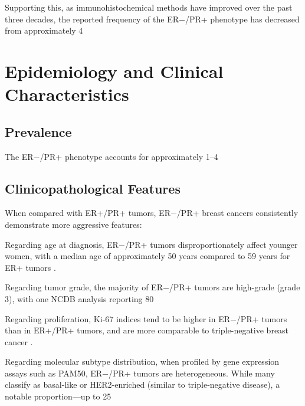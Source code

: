 \documentclass{article}
\begin{document}
Supporting this, as immunohistochemical methods have improved over the past three decades, the reported frequency of the ER−/PR+ phenotype has decreased from approximately 4%

\section{Epidemiology and Clinical Characteristics}

\subsection{Prevalence}

The ER−/PR+ phenotype accounts for approximately 1–4%

\subsection{Clinicopathological Features}

When compared with ER+/PR+ tumors, ER−/PR+ breast cancers consistently demonstrate more aggressive features:

Regarding age at diagnosis, ER−/PR+ tumors disproportionately affect younger women, with a median age of approximately 50 years compared to 59 years for ER+ tumors \citep{deyarmin2015}.

Regarding tumor grade, the majority of ER−/PR+ tumors are high-grade (grade 3), with one NCDB analysis reporting 80%

Regarding proliferation, Ki-67 indices tend to be higher in ER−/PR+ tumors than in ER+/PR+ tumors, and are more comparable to triple-negative breast cancer \citep{kunc2018}.

Regarding molecular subtype distribution, when profiled by gene expression assays such as PAM50, ER−/PR+ tumors are heterogeneous. While many classify as basal-like or HER2-enriched (similar to triple-negative disease), a notable proportion—up to 25%
\end{document}
